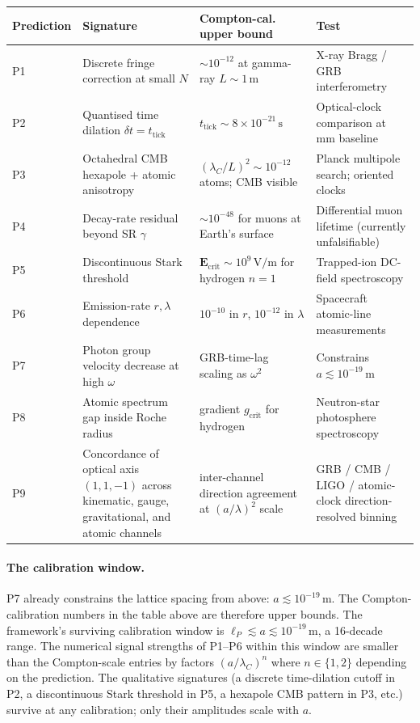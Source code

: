 \begin{center}
\renewcommand{\arraystretch}{1.20}
\begin{tabular}{p{0.55in}p{1.6in}p{1.6in}p{1.4in}}
\hline
\textbf{Prediction} & \textbf{Signature} & \textbf{Compton-cal. upper bound} & \textbf{Test} \\
\hline
P1 & Discrete fringe correction at small $N$ & $\sim 10^{-12}$ at gamma-ray $L \sim 1\,\text{m}$ & X-ray Bragg / GRB interferometry \\
P2 & Quantised time dilation $\delta t = t_\text{tick}$ & $t_\text{tick} \sim 8 \times 10^{-21}\,\text{s}$ & Optical-clock comparison at mm baseline \\
P3 & Octahedral CMB hexapole + atomic anisotropy & $(\lambda_C/L)^2 \sim 10^{-12}$ atoms; CMB visible & Planck multipole search; oriented clocks \\
P4 & Decay-rate residual beyond SR $\gamma$ & $\sim 10^{-48}$ for muons at Earth's surface & Differential muon lifetime (currently unfalsifiable) \\
P5 & Discontinuous Stark threshold & $\mathbf{E}_\text{crit} \sim 10^9\,\text{V/m}$ for hydrogen $n=1$ & Trapped-ion DC-field spectroscopy \\
P6 & Emission-rate $r,\lambda$ dependence & $10^{-10}$ in $r$, $10^{-12}$ in $\lambda$ & Spacecraft atomic-line measurements \\
P7 & Photon group velocity decrease at high $\omega$ & GRB-time-lag scaling as $\omega^2$ & Constrains $a \lesssim 10^{-19}\,\text{m}$ \\
P8 & Atomic spectrum gap inside Roche radius & gradient $g_\text{crit}$ for hydrogen & Neutron-star photosphere spectroscopy \\
P9 & Concordance of optical axis $(1,1,-1)$ across kinematic, gauge, gravitational, and atomic channels & inter-channel direction agreement at $(a/\lambda)^2$ scale & GRB / CMB / LIGO / atomic-clock direction-resolved binning \\
\hline
\end{tabular}
\end{center}

\paragraph{The calibration window.}
P7 already constrains the lattice spacing from above:
$a \lesssim 10^{-19}\,\text{m}$. The Compton-calibration numbers in
the table above are therefore upper bounds. The framework's
surviving calibration window is $\ell_P \lesssim a \lesssim 10^{-19}\,\text{m}$,
a 16-decade range. The numerical signal strengths of P1–P6 within
this window are smaller than the Compton-scale entries by factors
$(a/\lambda_C)^n$ where $n \in \{1, 2\}$ depending on the prediction.
The qualitative signatures (a discrete time-dilation cutoff in P2,
a discontinuous Stark threshold in P5, a hexapole CMB pattern in
P3, etc.) survive at any calibration; only their amplitudes scale
with $a$.

